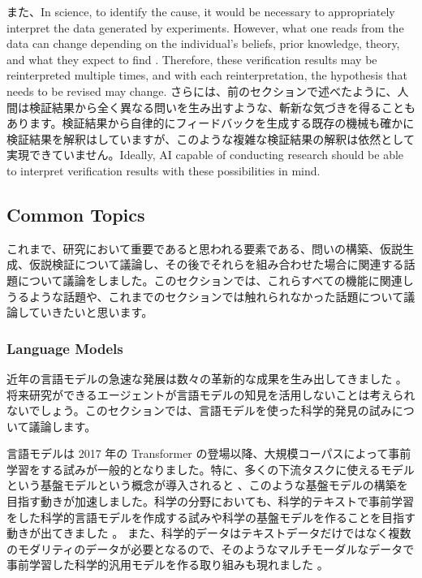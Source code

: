 また、In science, to identify the cause, it would be necessary to appropriately interpret the data generated by experiments. However, what one reads from the data can change depending on the individual's beliefs, prior knowledge, theory, and what they expect to find \cite{hanson1965patterns}. Therefore, these verification results may be reinterpreted multiple times, and with each reinterpretation, the hypothesis that needs to be revised may change. さらには、前のセクションで述べたように、人間は検証結果から全く異なる問いを生み出すような、斬新な気づきを得ることもあります。検証結果から自律的にフィードバックを生成する既存の機械も確かに検証結果を解釈はしていますが、このような複雑な検証結果の解釈は依然として実現できていません。Ideally, AI capable of conducting research should be able to interpret verification results with these possibilities in mind.


\subsection{Common Topics}
これまで、研究において重要であると思われる要素である、問いの構築、仮説生成、仮説検証について議論し、その後でそれらを組み合わせた場合に関連する話題について議論をしました。このセクションでは、これらすべての機能に関連しうるような話題や、これまでのセクションでは触れられなかった話題について議論していきたいと思います。

\subsubsection{Language Models}
近年の言語モデルの急速な発展は数々の革新的な成果を生み出してきました \cite{zhao2023survey}。将来研究ができるエージェントが言語モデルの知見を活用しないことは考えられないでしょう。このセクションでは、言語モデルを使った科学的発見の試みについて議論します。

言語モデルは 2017 年の Transformer の登場以降、大規模コーパスによって事前学習をする試みが一般的となりました。特に、多くの下流タスクに使えるモデルという基盤モデルという概念が導入されると \cite{bommasani2021opportunities}、このような基盤モデルの構築を目指す動きが加速しました。科学の分野においても、科学的テキストで事前学習をした科学的言語モデルを作成する試みや科学の基盤モデルを作ることを目指す動きが出てきました \cite{beltagy2019scibert,singh2022scirepeval,nadkarni2021scientific,cohan2020specter,gupta2022matscibert,taylor2022galactica,azerbayev2023llemma,xie2023darwin,luo2022biogpt,li2023llava}。 また、科学的データはテキストデータだけではなく複数のモダリティのデータが必要となるので、そのようなマルチモーダルなデータで事前学習した科学的汎用モデルを作る取り組みも現れました \cite{singhal2023towards,takeda2023foundation,nguyen2023climax}。

